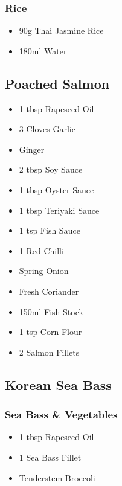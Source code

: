 \documentclass[11pt, english]{article}
\begin{document}
		\subsubsection*{Rice}

	\begin{itemize}
        \setlength\itemsep{0cm}
                \item 90g Thai Jasmine Rice
		\item 180ml Water
        \end{itemize}

\newpage

	\subsection{Poached Salmon}

	\begin{itemize}
        \setlength\itemsep{0cm}
                \item 1 tbsp Rapeseed Oil
		\item 3 Cloves Garlic
		\item Ginger
		\item 2 tbsp Soy Sauce
		\item 1 tbsp Oyster Sauce
		\item 1 tbsp Teriyaki Sauce
		\item 1 tsp Fish Sauce
		\item 1 Red Chilli
		\item Spring Onion
		\item Fresh Coriander
		\item 150ml Fish Stock
		\item 1 tsp Corn Flour
		\item 2 Salmon Fillets
        \end{itemize}

\newpage

	\subsection{Korean Sea Bass}

		\subsubsection*{Sea Bass \& Vegetables}
	
	\begin{itemize}
        \setlength\itemsep{0cm}
                \item 1 tbsp Rapeseed Oil
		\item 1 Sea Bass Fillet
		\item Tenderstem Broccoli
        \end{itemize}
\end{document}
